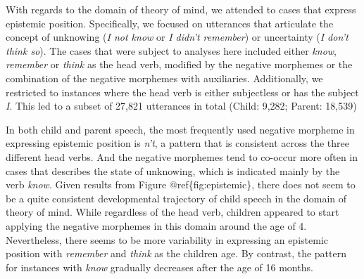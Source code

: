 \documentclass[10pt, letterpaper]{article}
\begin{document}
With regards to the domain of theory of mind, we attended to cases that
express epistemic position. Specifically, we focused on utterances that
articulate the concept of unknowing (\emph{I not know} or \emph{I didn't
remember}) or uncertainty (\emph{I don't think so}). The cases that were
subject to analyses here included either \emph{know}, \emph{remember} or
\emph{think} as the head verb, modified by the negative morphemes or the
combination of the negative morphemes with auxiliaries. Additionally, we
restricted to instances where the head verb is either subjectless or has
the subject \emph{I}. This led to a subset of 27,821 utterances in total
(Child: 9,282; Parent: 18,539)

In both child and parent speech, the most frequently used negative
morpheme in expressing epistemic position is \emph{n't}, a pattern that
is consistent across the three different head verbs. And the negative
morphemes tend to co-occur more often in cases that describes the state
of unknowing, which is indicated mainly by the verb \emph{know}. Given
results from Figure @ref\{fig:epistemic\}, there does not seem to be a
quite consistent developmental trajectory of child speech in the domain
of theory of mind. While regardless of the head verb, children appeared
to start applying the negative morphemes in this domain around the age
of 4. Nevertheless, there seems to be more variability in expressing an
epistemic position with \emph{remember} and \emph{think} as the children
age. By contrast, the pattern for instances with \emph{know} gradually
decreases after the age of 16 months.
\end{document}
